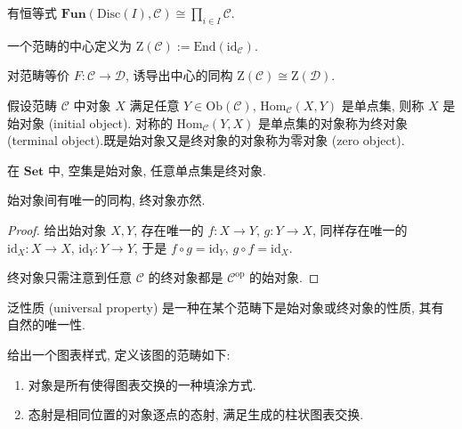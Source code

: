 \begin{lemma}
    有恒等式 \(\mathbf{Fun} (\mathrm{Disc} (I), \mathcal{C}) \cong \prod_{i \in I} \mathcal{C}\).
\end{lemma}

\begin{definition}[中心]
    一个范畴的中心定义为 \(\mathrm{Z} (\mathcal{C}) := \mathrm{End} (\mathrm{id}_{\mathcal{C}})\).

    对范畴等价 \(F : \mathcal{C} \to \mathcal{D}\), 诱导出中心的同构 \(\mathrm{Z} (\mathcal{C}) \cong \mathrm{Z} (\mathcal{D})\).
\end{definition}

\begin{definition}
    假设范畴 \(\mathcal{C}\) 中对象 \(X\) 满足任意 \(Y \in \mathrm{Ob} (\mathcal{C})\), \(\mathrm{Hom}_{\mathcal{C}} (X,Y)\) 是单点集, 则称 \(X\) 是始对象 (initial object).
    对称的 \(\mathrm{Hom}_{\mathcal{C}} (Y,X)\) 是单点集的对象称为终对象 (terminal object).既是始对象又是终对象的对象称为零对象 (zero object).
\end{definition}

\begin{example}
    在 \(\mathbf{Set}\) 中, 空集是始对象, 任意单点集是终对象.
\end{example}

\begin{definition}
    始对象间有唯一的同构, 终对象亦然.

    \begin{proof}
        给出始对象 \(X,Y\), 存在唯一的 \(f : X \to Y\), \(g : Y \to X\),
        同样存在唯一的 \(\mathrm{id}_X : X \to X\), \(\mathrm{id}_Y : Y \to Y\), 于是 \(f \circ g = \mathrm{id}_Y\), \(g \circ f = \mathrm{id}_X\).

        终对象只需注意到任意 \(\mathcal{C}\) 的终对象都是 \(\mathcal{C}^{\mathrm{op}}\) 的始对象.
    \end{proof}
\end{definition}

\begin{definition}
    泛性质 (universal property) 是一种在某个范畴下是始对象或终对象的性质, 其有自然的唯一性.
\end{definition}

\begin{definition}[图范畴]
    给出一个图表样式, 定义该图的范畴如下:

    \begin{enumerate}
        \item 对象是所有使得图表交换的一种填涂方式.
        \item 态射是相同位置的对象逐点的态射, 满足生成的柱状图表交换.
    \end{enumerate}
\end{definition}

